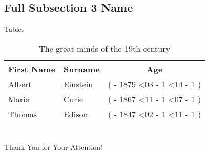 \documentclass[
]{beamer}
\begin{document}
	\subsection[Short Subsection 3 Name]{Full Subsection 3 Name}
	
	\def\age(#1-#2-#3){%
		\the\numexpr(
		\year - #1
		\ifnum\month<#2
		- 1
		\else
		\ifnum\month=#2
		\ifnum\day<#3
		- 1
		\fi
		\fi
		\fi
		)%
	}
	
	\begin{frame}{Tables}
		\begin{table}
			\begin{tabular}{llc}
				First Name & Surname & Age \\ \midrule
				Albert & Einstein & \age(1879-03-14) \\
				Marie & Curie & \age(1867-11-07) \\
				Thomas & Edison & \age(1847-02-11) \\
			\end{tabular}
			\caption{The great minds of the 19th century}
		\end{table}
	\end{frame}
	
	\section{\bibname}
	\begin{frame}[t, allowframebreaks]{\bibname}
		\printbibliography[heading=none]
	\end{frame}
	
	\begin{frame}[plain]
		\vfill
		\centerline{Thank You for Your Attention!}
		\vfill\vfill
	\end{frame}
	
\end{document}
